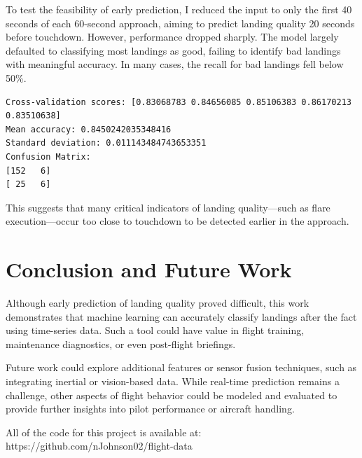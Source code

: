 \documentclass[conference]{IEEEtran}
\begin{document}
To test the feasibility of early prediction, I reduced the input to only the first 40 seconds of each 60-second approach, aiming to predict landing quality 20 seconds before touchdown. However, performance dropped sharply. The model largely defaulted to classifying most landings as good, failing to identify bad landings with meaningful accuracy. In many cases, the recall for bad landings fell below 50\%.

\begin{lstlisting}[caption={Gradient boosting prediciton model performance}]
Cross-validation scores: [0.83068783 0.84656085 0.85106383 0.86170213 0.83510638]
Mean accuracy: 0.8450242035348416
Standard deviation: 0.011143484743653351
Confusion Matrix:
[152   6]
[ 25   6]
\end{lstlisting}


This suggests that many critical indicators of landing quality—such as flare execution—occur too close to touchdown to be detected earlier in the approach.

\balance

\section{Conclusion and Future Work}
Although early prediction of landing quality proved difficult, this work demonstrates that machine learning can accurately classify landings after the fact using time-series data. Such a tool could have value in flight training, maintenance diagnostics, or even post-flight briefings.

Future work could explore additional features or sensor fusion techniques, such as integrating inertial or vision-based data. While real-time prediction remains a challenge, other aspects of flight behavior could be modeled and evaluated to provide further insights into pilot performance or aircraft handling.

All of the code for this project is available at: https://github.com/nJohnson02/flight-data



\end{document}
